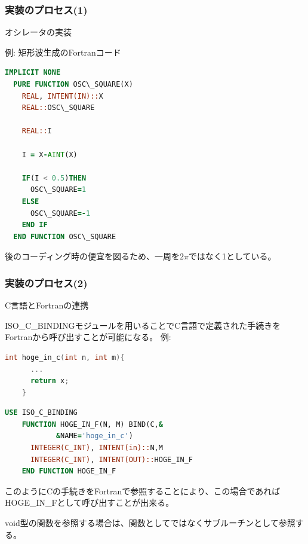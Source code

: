 \documentclass[dvipdfmx]{beamer} %
\begin{document}
\begin{frame}[fragile]
  \frametitle{実装のプロセス(1)}
  \alert{オシレータの実装}
  
  例: 矩形波生成のFortranコード
  \begin{lstlisting}[language={Fortran}]
  IMPLICIT NONE
  PURE FUNCTION OSC\_SQUARE(X)
    REAL, INTENT(IN)::X
    REAL::OSC\_SQUARE

    REAL::I

    I = X-AINT(X)

    IF(I < 0.5)THEN
      OSC\_SQUARE=1
    ELSE
      OSC\_SQUARE=-1
    END IF
  END FUNCTION OSC\_SQUARE 
  \end{lstlisting}
  
  \vspace{0.5em}
  後のコーディング時の便宜を図るため、一周を$2\pi$ではなく1としている。
\end{frame}

\begin{frame}[fragile]
  \frametitle{実装のプロセス(2)}
  \alert{C言語とFortranの連携}\par
  ISO\_C\_BINDINGモジュールを用いることでC言語で定義された手続きをFortranから呼び出すことが可能になる。
  例:\par
  \begin{lstlisting}[language={C}]
    int hoge_in_c(int n, int m){
      ...
      return x;
    }
  \end{lstlisting}
  \begin{lstlisting}[language={Fortran}]
    USE ISO_C_BINDING
    FUNCTION HOGE_IN_F(N, M) BIND(C,&
            &NAME='hoge_in_c')
      INTEGER(C_INT), INTENT(in)::N,M
      INTEGER(C_INT), INTENT(OUT)::HOGE_IN_F
    END FUNCTION HOGE_IN_F
  \end{lstlisting}  
  このようにCの手続きをFortranで参照することにより、この場合であればHOGE\_IN\_Fとして呼び出すことが出来る。\par
  void型の関数を参照する場合は、関数としてではなくサブルーチンとして参照する。
\end{frame}
\end{document}
